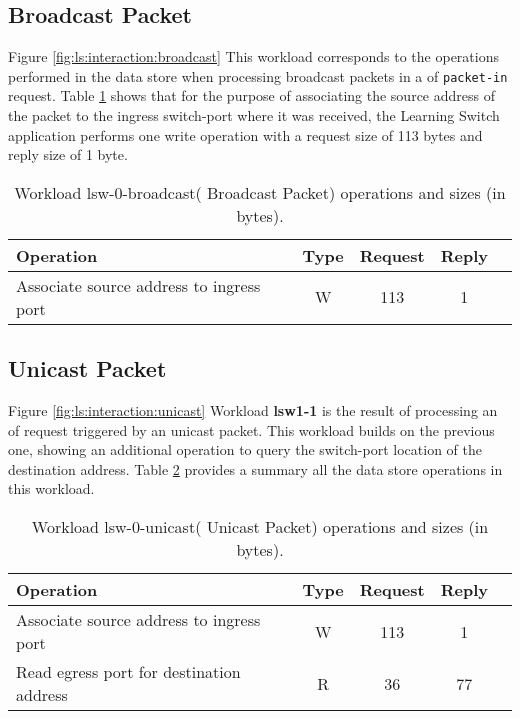 \subsection{Broadcast Packet}
Figure \ref{fig:ls:interaction:broadcast}
This workload corresponds to the operations performed in the data
store when processing broadcast packets in a \acrfull{of} 
\texttt{packet-in} request.  Table \ref{table:lsw0:broadcast} shows that for the
purpose of associating the source address of the packet to the ingress
switch-port where it was received, the Learning Switch application performs one
write operation with a request size of 113 bytes and reply size of 1
byte. 

\begin{table}[ht]
\centering 
\begin{tabular}{l c c c c}
 Operation & Type & Request & Reply \\ \toprule 
 Associate source address to ingress port & W & 113 & 1 \\ \bottomrule
\end{tabular}
\caption[Workload lsw-0-broadcast( Broadcast Packet) operations]{Workload lsw-0-broadcast( Broadcast Packet) operations and sizes (in bytes).}
\label{table:lsw0:broadcast}
\end{table}

\subsection{Unicast Packet}
Figure                \ref{fig:ls:interaction:unicast}
Workload \textbf{lsw1-1} is the result of processing an \acrfull{of} request
triggered by an unicast packet. This workload builds on the previous
one, showing an additional operation to query the switch-port location of the
destination address. Table \ref{table:lsw0:unicast} provides a summary all the data
store operations in this workload. 

\begin{table}[ht]
\centering 
\begin{tabular}{l c c c c}
 Operation & Type & Request & Reply  \\ \toprule 
 Associate source address to ingress port & W & 113 & 1\\\midrule
Read egress port for destination address & R & 36 & 77 \\\bottomrule
\end{tabular}
\caption[Workload lsw-0-unicast( Unicast Packet) operations]{Workload lsw-0-unicast( Unicast Packet) operations and sizes (in bytes).}
\label{table:lsw0:unicast}
\end{table}

